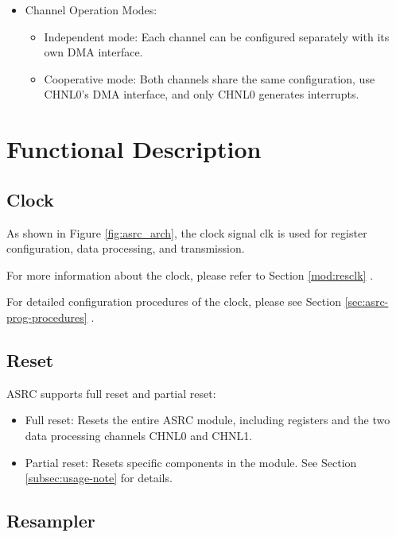 \documentclass[main\_\_EN.tex]{subfiles}
\begin{document}
\begin{itemize}
    \item Channel Operation Modes:
       \begin{itemize}
         \item Independent mode: Each channel can be configured separately with its own DMA interface.
         \item Cooperative mode: Both channels share the same configuration, use CHNL0's DMA interface, and only CHNL0 generates interrupts.
     \end{itemize}
\end{itemize}



\section{Functional Description}
\label{sec:asrc-func-descr}

\subsection{Clock}

As shown in Figure \ref{fig:asrc_arch}, the clock signal clk is used for register configuration, data processing, and transmission.

For more information about the clock, please refer to Section \ref{mod:resclk} \textit{}.

For detailed configuration procedures of the clock, please see Section \ref{sec:asrc-prog-procedures} \textit{}.

\subsection{Reset}

ASRC supports full reset and partial reset:

\begin{itemize}
    \item Full reset: Resets the entire ASRC module, including registers and the two data processing channels CHNL0 and CHNL1.
    \item Partial reset: Resets specific components in the module. See Section \ref{subsec:usage-note} \textit{} for details.
\end{itemize}

\subsection{Resampler}
\end{document}
